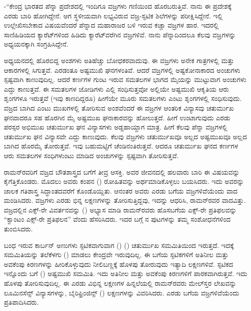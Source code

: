 -“ಕೇಂದ್ರ ಭಾರತದ ಪೆನ್ನಾ ಪ್ರದೇಶದಲ್ಲಿ ಇಂದಿಗೂ ವಜ್ರಗಳು ಗಣಿಯಿಂದ ಹೊರಬರುತ್ತಿವೆ. ನಾನು ಈ ಪ್ರದೇಶಕ್ಕೆ ಎರಡು ಬಾರಿ ಹೋಗಿದ್ದೇನೆ. ಆಗ ಸ್ಥಳೀಯವಾಗಿ ಲಭ್ಯವಿರುವ ವಜ್ರ-ಸ್ಫಟಿಕ ಶಿಲೆಗಳನ್ನು ಪರೀಕ್ಷಿಸಿದ್ದೇನೆ. ಇಲ್ಲಿ ಉಲ್ಲೇಖಿಸಬೇಕಾದ ವಿಷಯವೆಂದರೆ ಪೆನ್ನಾದ ಮಹಾರಾಜರ ಬಳಿ ಇರುವ  ಕಚ್ಚಾ ವಜ್ರಗಳ ಹಾರ. ಇದರಲ್ಲಿ ಸಾಣಿಹಿಡಿಯದ  ಕ್ಯಾರೆಟ್‍ಗಳಿಂದ ಹಿಡಿದು  ಕ್ಯಾರೆಟ್‍ವರೆಗಿನ ವಜ್ರಗಳಿವೆ. ನಾನು ಪೆನ್ನಾದಿಂದಲೂ ಕೆಲವು ವಜ್ರಗಳನ್ನು ಅಧ್ಯಯನಕ್ಕಾಗಿ ಸಂಗ್ರಹಿಸಿದ್ದೇನೆ.

ಅಧ್ಯಯನದಲ್ಲಿ ಹೊರಬಿದ್ದ ಅಂಶಗಳು ಅತಿಹೆಚ್ಚು ಬೋಧಕರವಾದುವು. ಈ ವಜ್ರಗಳು ಅನೇಕ ಗಾತ್ರಗಳಲ್ಲಿ ಮತ್ತು ಆಕಾರಗಳಲ್ಲಿ ಸಿಗುತ್ತವೆ. ಎರಡಂತೂ ಅಷ್ಟಮುಖಿ ಘನಗಳಂತಿವೆ. ಆದರೆ ವಜ್ರಗಳಲ್ಲಿ ಅಷ್ಟಕೋನಾಕಾರದ ಅಂಚುಗಳು ಸ್ಪಷ್ಟವಾಗಿ ಕಾಣುವುದಿಲ್ಲ. ಆದರೆ ಕರ್ಣಗಳ ಗುಂಟ ಇರುವ ಸಮತಲಗಳ ಭಾಗದ ಮೈಯನ್ನು ಮುಟ್ಟುವಾಗ ಅಂಚುಗಳು ಎದ್ದು ಕಾಣುತ್ತವೆ. ಈ ಸಮತಲಗಳ ಜೋಡಿಗಳು ಎಲ್ಲಿ ಸಂಧಿಸುತ್ತವೋ ಅಲ್ಲಿಯೇ ಅಷ್ಟಮುಖಿ ಆಕೃತಿಯ ಆರು ಶೃಂಗಗಳೂ ಇರುತ್ತವೆ (ಇವು ಕಾಣದಿದ್ದರೂ) ಹೀಗೆಯೇ ಮೂರು ಸಮತಲಗಳು ಎಂಟು ಶೃಂಗಗಳಲ್ಲಿ ಸಂಧಿಸುವುದು. ವಜ್ರದ ಬಾಗಿದ ಎಂಟು ಮುಖಗಳಲ್ಲಿ ತೋರಿಸುವ ಅಂಶವೆಂದರೆ ಈ ವಜ್ರಗಳ ಆಂತರಿಕ ವಿನ್ಯಾಸವು ಚತುರ್ಮುಖ ಘನವಾದರೂ ಸಹ ಹೊರಗಿನ ಮೈ ಅಷ್ಟಮುಖ ಘನಾಕಾರವನ್ನು ಹೋಲುತ್ತದೆ. ಹೀಗೆ ಉಂಟಾಗುವುದು  ಎರಡು ಪರಸ್ಪರ ಅಭಿಮುಖ ಚತುರ್ಮುಖ ಘನ ವಿನ್ಯಾಸಗಳು ಅಡ್ಡಹಾಯ್ದಾಗ ಮಾತ್ರ. ಹೀಗೆ ಕೆಲವು ಪೆನ್ನಾ ವಜ್ರಗಳಲ್ಲಿ ಚತುರ್ಮುಖ ಘನ ವಿನ್ಯಾಸವೇ ಎದ್ದು ಕಾಣುವುದು. ಕೆಲವು ವಜ್ರಗಳು ಚತುರ್ಮುಖವೂ ಅಲ್ಲದ ಅಷ್ಟಮುಖವೂ ಅಲ್ಲದ ಬಾಗಿದ ಹೊರಮೈ ತೋರುತ್ತವೆ. ಇವು ಬಹುಮಟ್ಟಿಗೆ ಚೆಂಡಿನಂತಿರುತ್ತವೆ. ಆದರೂ ಚತುರ್ಮುಖ ಘನದ ಕರ್ಣಗಳ ಆರು ಸಮತಲಗಳ ಸಂಧಿಗಳುಂಟು ಮಾಡಿದ ಅಂಚುಗಳನ್ನು ಸ್ಪಷ್ಟವಾಗಿ ತೋರಿಸುತ್ತವೆ.



ರಾಮನ್‍ರವರಿಗೆ ವಜ್ರದ ಬೌತಶಾಸ್ತ್ರದ ಬಗೆಗೆ ತೀವ್ರ ಆಸಕ್ತಿ. ಅವರ ಜೀವನದಲ್ಲಿ ಹಲವಾರು ಬಾರಿ ಈ ವಿಷಯವನ್ನು ಕೈಗೆತ್ತಿಕೊಂಡರು. ಮೊದಲು ಅವರು ಕಂಪನ () ರೋಹಿತವನ್ನು ಅರ್ಥಮಾಡಿಕೊಳ್ಳಲು ಬಯಸಿದರು. ಇದು ಅವರನ್ನು ಜಾಲಕ ಗತಿಶಾಸ್ತ್ರ ಸಿದ್ಧಾಂತದವರೆಗೆ ಕೊಂಡೊಯ್ದಿತು. ಆನಂತರ ಅವರು ಎರಡು ಬಗೆಯ ವಜ್ರಗಳಿವೆಯೆಂದು ವಾದ ಮಂಡಿಸಿದರು. ವಜ್ರಗಳು ಎರಡು ಭಿನ್ನ ಲಕ್ಷಣಗಳನ್ನು ತೋರಿಸುತ್ತಿದ್ದವು, ಇದನ್ನು ಆಧರಿಸಿ, ರಾಮನ್‍ರವರ ವಾದವಿತ್ತು. ವಜ್ರದಲ್ಲಿನ ಎಕ್ಸ್-ರೇ ವಿವರ್ತನವನ್ನು () ಅಭ್ಯಾಸ ಮಾಡಿ ರಾಮನ್‍ರವರು ಹೊಸಬಗೆಯ ಎಕ್ಸ್-ರೇ ಪ್ರತಿಫಲವನ್ನು “ಕ್ವಾಂಟಂ ಎಕ್ಸ್-ರೇ ಪ್ರತಿಫಲನ” ವೆಂದು ಹೆಸರಿಸಿದರು. ಇದರ ಬಗ್ಗೆ \textit{}ನ ಪುಟಗಳನ್ನು ತಮ್ಮ ಸಂಶೋಧನೆಗಳಿಂದ ತುಂಬಿಸಿದರು.

 ಬಂಧ ಇರುವ ಕಾರ್ಬನ್ ಅಣುಗಳು ಸ್ಫಟಿಕವಾಗುವಾಗ () () ಚತುರ್ಮುಖ ಸಮಮಿತಿಯಿಂದ ಇರುತ್ತದೆ. ಇದಕ್ಕೆ ಸಮಮಿತಿಯನ್ನು ತಲೆಕೆಳಗು () ಮಾಡಲು ಕೇಂದ್ರವೇ ಇರುವುದಿಲ್ಲ. ಈ ಬಗೆಯ ಸ್ಫಟಿಕಗಳಿಗೆ ಅತಿನೀಲ ಮತ್ತು ಅವಕೆಂಪು ಕಿರಣಗಳನ್ನು ಹೀರಿಕೊಳ್ಳುವುದು ನೀಲಿಬಣ್ಣಕ್ಕೆ ಹೊಳಪು ತೋರುವುದು ಇತ್ಯಾದಿ ಲಕ್ಷಣಗಳಿವೆ. ಸ್ಫಟಿಕದ ಇನ್ನೊಂದು ಬಗೆ () ಅಷ್ಟಮುಖಿ ಸಮಮಿತಿ. ಇದು ಅತಿನೀಲ ಮತ್ತು ಅವಕೆಂಪು ಕಿರಣಗಳಿಗೆ ಪಾರಕವಾಗಿರುತ್ತವೆ. ಇದು ಹೊಳಪು ತೋರಿಸುವುದಿಲ್ಲ. ಈ ಎರಡು ವಿಭಿನ್ನ ಲಕ್ಷಣಗಳ ಹಿನ್ನಲೆಯಲ್ಲಿ ರಾಮನ್‍ರವರು ಮೇಲ್‍ಸ್ತರ ಲೇಖವನ್ನು ಲೂಮಿನಸೆನ್ಸ್ ವಿನ್ಯಾಸಗಳನ್ನು, ಬೈರಿಫ್ರಿಂಜಿನ್ಸ್ ()  ಲಕ್ಷಣಗಳನ್ನು ವಿವರಿಸಿದರು. ಎರಡು ಬಗೆಯ ವಜ್ರಗಳಿವೆಯೆಂದು ಪ್ರತಿಪಾದಿಸಿದರು.

